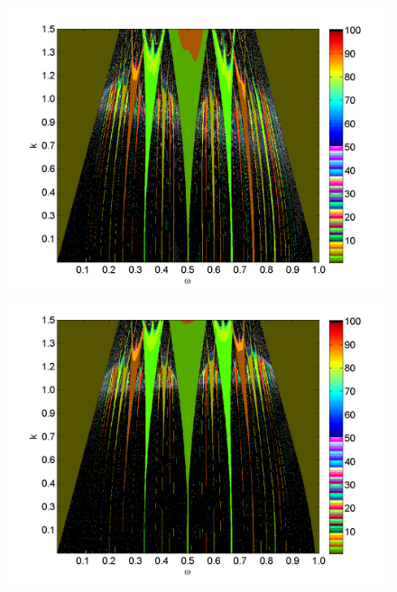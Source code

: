 \begin{figure}[H]
\includegraphics[width=.5\textwidth]{figs/tongues_u_halfa_1000_L_07.png}\hfill
\includegraphics[width=.5\textwidth]{figs/tongues_u_halfa_1000_L_09.png}\\
\end{figure}

